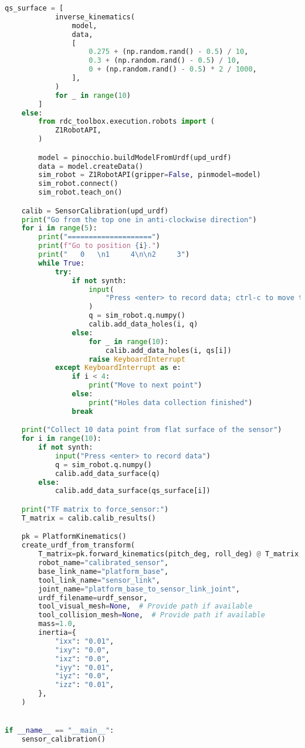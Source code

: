 \begin{lstlisting}[language=python, caption=\raggedright{calibration/sensor\_calibration.py}, frame=single]
        qs_surface = [
            inverse_kinematics(
                model,
                data,
                [
                    0.275 + (np.random.rand() - 0.5) / 10,
                    0.3 + (np.random.rand() - 0.5) / 10,
                    0 + (np.random.rand() - 0.5) * 2 / 1000,
                ],
            )
            for _ in range(10)
        ]
    else:
        from rdc_toolbox.execution.robots import (
            Z1RobotAPI,
        )

        model = pinocchio.buildModelFromUrdf(upd_urdf)
        data = model.createData()
        sim_robot = Z1RobotAPI(gripper=False, pinmodel=model)
        sim_robot.connect()
        sim_robot.teach_on()

    calib = SensorCalibration(upd_urdf)
    print("Go from the top one in anti-clockwise direction")
    for i in range(5):
        print("====================")
        print(f"Go to position {i}.")
        print("   0   \n1     4\n\n2     3")
        while True:
            try:
                if not synth:
                    input(
                        "Press <enter> to record data; ctrl-c to move to the next point."
                    )
                    q = sim_robot.q.numpy()
                    calib.add_data_holes(i, q)
                else:
                    for _ in range(10):
                        calib.add_data_holes(i, qs[i])
                    raise KeyboardInterrupt
            except KeyboardInterrupt as e:
                if i < 4:
                    print("Move to next point")
                else:
                    print("Holes data collection finished")
                break

    print("Collect 10 data point from flat surface of the sensor")
    for i in range(10):
        if not synth:
            input("Press <enter> to record data")
            q = sim_robot.q.numpy()
            calib.add_data_surface(q)
        else:
            calib.add_data_surface(qs_surface[i])

    print("TF matrix to force_sensor:")
    T_matrix = calib.calib_results()

    pk = PlatformKinematics()
    create_urdf_from_transform(
        T_matrix=pk.forward_kinematics(pitch_deg, roll_deg) @ T_matrix,
        robot_name="calibrated_sensor",
        base_link_name="platform_base",
        tool_link_name="sensor_link",
        joint_name="platform_base_to_sensor_link_joint",
        urdf_filename=urdf_sensor,
        tool_visual_mesh=None,  # Provide path if available
        tool_collision_mesh=None,  # Provide path if available
        mass=1.0,
        inertia={
            "ixx": "0.01",
            "ixy": "0.0",
            "ixz": "0.0",
            "iyy": "0.01",
            "iyz": "0.0",
            "izz": "0.01",
        },
    )


if __name__ == "__main__":
    sensor_calibration()
    
\end{lstlisting}